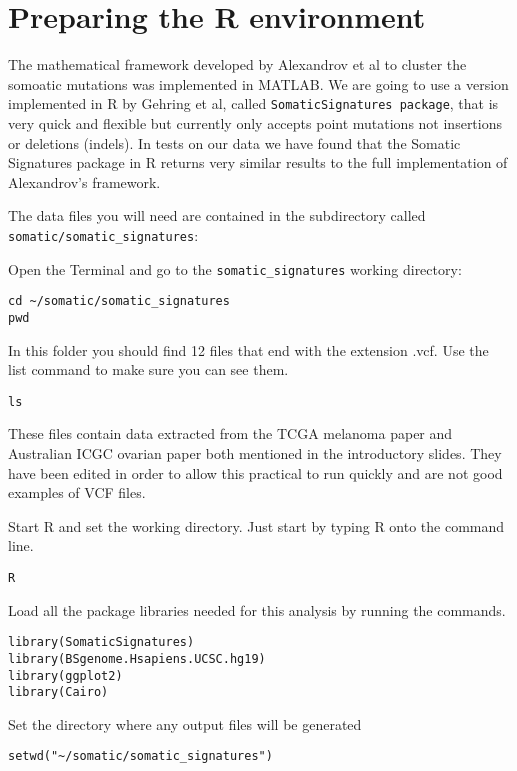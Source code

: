 \section{Preparing the R environment}

\begin{information}
The mathematical framework developed by Alexandrov et al to cluster the somoatic mutations was implemented in MATLAB.
We are going to use a version implemented in R by Gehring et al, called \texttt{SomaticSignatures package}, that is very quick and flexible but currently only accepts point mutations not insertions or deletions (indels).
In tests on our data we have found that the Somatic Signatures package in R returns very similar results to the full implementation of Alexandrov's framework.
\end{information}
\vspace{4 mm}

The data files you will need are contained in the subdirectory called
\texttt{somatic/somatic\_signatures}:

\begin{steps}
Open the Terminal and go to the \texttt{somatic\_signatures} working directory:
\begin{lstlisting}
cd ~/somatic/somatic_signatures
pwd
\end{lstlisting}

In this folder you should find 12 files that end with the extension .vcf. Use the list command to make sure you can see them.
\begin{lstlisting}
ls
\end{lstlisting}
\end{steps}

\begin{note}
These files contain data extracted from the TCGA melanoma paper and Australian ICGC ovarian paper both mentioned in the introductory slides.
They have been edited in order to allow this practical to run quickly and are not good examples of VCF files.
\end{note}

\begin{steps}
Start R and set the working directory. Just start by typing R onto the command line.
\begin{lstlisting}
R
\end{lstlisting}

Load all the package libraries needed for this analysis by running the commands.
\begin{lstlisting}
library(SomaticSignatures)
library(BSgenome.Hsapiens.UCSC.hg19)
library(ggplot2)
library(Cairo)
\end{lstlisting}

Set the directory where any output files will be generated
\begin{lstlisting}
setwd("~/somatic/somatic_signatures")
\end{lstlisting}
\end{steps}


